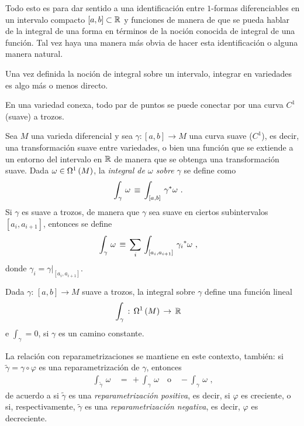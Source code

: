 Todo esto es para dar sentido a una identificaci\'{o}n entre
$1$-formas diferenciables en un intervalo compacto $[a,b]\subset\bb{R}$ y
funciones de manera de que se pueda hablar de la integral de una forma
en t\'{e}rminos de la noci\'{o}n conocida de integral de una funci\'{o}n.
Tal vez haya una manera m\'{a}s obvia de hacer esta identificaci\'{o}n o
alguna manera natural.

Una vez definida la noci\'{o}n de integral sobre un intervalo, integrar en
variedades es algo m\'{a}s o menos directo.

\begin{obsVariedadSuaveATrozosConexa}\label{obs:variedadsuaveatrozosconexa}
	En una variedad conexa, todo par de puntos se puede conectar por
	una curva $C^{1}$ (suave) a trozos.
\end{obsVariedadSuaveATrozosConexa}

Sea $M$ una varieda diferencial y sea $\gamma:[a,b]\rightarrow M$ una
curva suave ($C^{1}$), es decir, una transformaci\'{o}n suave entre
variedades, o bien una funci\'{o}n que se extiende a un entorno del
intervalo en $\bb{R}$ de manera que se obtenga una transformaci\'{o}n
suave. Dada $\omega\in\formes[1]{M}$, la \emph{integral de $\omega$ sobre %
$\gamma$} se define como
\begin{align*}
	\int_{\gamma}\,\omega & \,\equiv\,\int_{[a,b]}\,\pull{\gamma}\omega
	\text{ .}
\end{align*}
%
Si $\gamma$ es suave a trozos, de manera que $\gamma$ sea suave en ciertos
subintervalos $[a_{i},a_{i+1}]$, entonces se define
\begin{align*}
	\int_{\gamma}\,\omega & \,\equiv\,\sum_{i}\,
		\int_{[a_{i},a_{i+1}]}\,\pull{\gamma_{i}}\omega
	\text{ ,}
\end{align*}
%
donde $\gamma_{i}=\gamma|_{[a_{i},a_{i+1}]}$.

\begin{obsIntegralEsLinealEnFormas}\label{obs:integraleslinealenformas}
	Dada $\gamma:\,[a,b]\rightarrow M$ suave a trozos, la integral
	sobre $\gamma$ define una funci\'{o}n lineal
	\begin{align*}
		\int_{\gamma} & \,:\,\formes[1]{M}\,\rightarrow\,\bb{R}
	\end{align*}
	e $\int_{\gamma}=0$, si $\gamma$ es un camino constante.
\end{obsIntegralEsLinealEnFormas}

\begin{obsIntegralEnCaminoInverso}\label{obs:integralencaminoinverso}
	La relaci\'{o}n con reparametrizaciones se mantiene en este
	contexto, tambi\'{e}n: si $\tilde{\gamma}=\gamma\circ\varphi$
	es una reparametrizaci\'{o}n de $\gamma$, entonces
	\begin{align*}
		\int_{\tilde{\gamma}}\,\omega & \,=\,
			+\int_{\gamma}\,\omega\quad\text{o}\quad
			-\int_{\gamma}\,\omega
		\text{ ,}
	\end{align*}
	de acuerdo a si $\tilde{\gamma}$ es una \emph{reparametrizaci\'{o}n %
	positiva}, es decir, si $\varphi$ es creciente, o si,
	respectivamente, $\tilde{\gamma}$ es una \emph{reparametrizaci\'{o}n %
	negativa}, es decir, $\varphi$ es decreciente.
\end{obsIntegralEnCaminoInverso}

